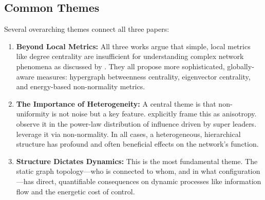 \documentclass[10pt, a4paper]{article}
\begin{document}
    

\subsection{Common Themes}
Several overarching themes connect all three papers:
\begin{enumerate}
    \item \textbf{Beyond Local Metrics:} All three works argue that simple, local metrics like degree centrality  are insufficient for understanding complex network phenomena as discussed by \cite{Lee2021Betweenness}. They all propose more sophisticated, globally-aware measures: hypergraph betweenness centrality, eigenvector centrality, and energy-based non-normality metrics.
    
    \item \textbf{The Importance of Heterogeneity:} A central theme is that non-uniformity is not noise but a key feature. \cite{Bof2017Role} explicitly frame this as anisotropy. \cite{Lee2021Betweenness} observe it in the power-law distribution of influence driven by super leaders. \cite{Lindmark2021Centrality} leverage it via non-normality. In all cases, a heterogeneous, hierarchical structure has profound and often beneficial effects on the network's function.
    
    \item \textbf{Structure Dictates Dynamics:} This is the most fundamental theme. The static graph topology—who is connected to whom, and in what configuration—has direct, quantifiable consequences on dynamic processes like information flow and the energetic cost of control.
\end{enumerate}
\end{document}
